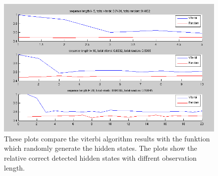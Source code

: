 \documentclass[a4paper, 12pt, titlepage]{article}
\begin{document}
\begin{figure}[h]
	\includegraphics[width=\textwidth]{images/experiment_results.png}
	\caption{These plots compare the viterbi algorithm results with the funktion which randomly generate the hidden states. The plots show the relative correct detected hidden states with diffrent observation length.}
\end{figure}
\end{document}
